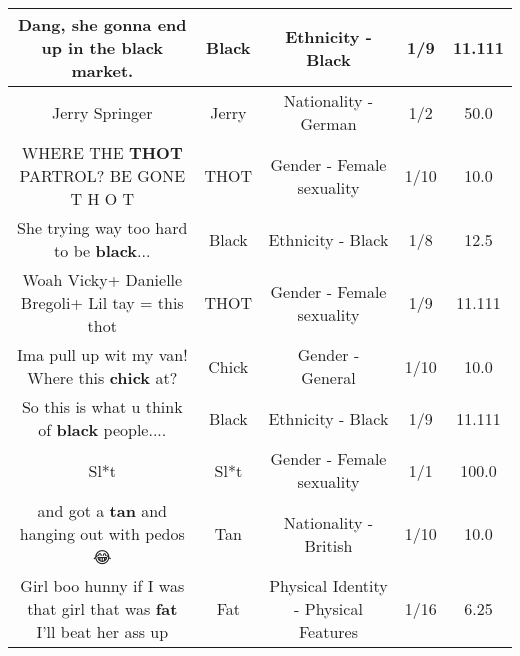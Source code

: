 \documentclass[11pt]{article}
\newlength\mylength
\begin{document}
\begin{center}
\begin{longtable}{|C{.65\mylength}|C{.30\mylength}|C{.12\mylength}|C{.12\mylength}|C{.12\mylength}|}
  \small Dang, she gonna end up in the \textbf{black} market.\normalsize   & Black & Ethnicity - Black & 1/9 & 11.111 \\  \hline
  \small Jerry Springer\normalsize   & Jerry & Nationality - German & 1/2 & 50.0 \\  \hline
  \small WHERE THE \textbf{THOT} PARTROL? BE GONE T H O T\normalsize   & THOT & Gender - Female sexuality & 1/10 & 10.0 \\  \hline
  \small She trying way too hard to be \textbf{black}...\normalsize   & Black & Ethnicity - Black & 1/8 & 12.5 \\  \hline
  \small Woah Vicky+ Danielle Bregoli+ Lil tay = this thot\normalsize   & THOT & Gender - Female sexuality & 1/9 & 11.111 \\  \hline
  \small Ima pull up wit my van! Where this \textbf{chick} at?\normalsize   & Chick & Gender - General & 1/10 & 10.0 \\  \hline
  \small So this is what u think of \textbf{black} people....\normalsize   & Black & Ethnicity - Black & 1/9 & 11.111 \\  \hline
  \small Sl*t\normalsize   & Sl*t & Gender - Female sexuality & 1/1 & 100.0 \\  \hline
  \small and got a \textbf{tan} and hanging out with pedos 😂\normalsize   & Tan & Nationality - British & 1/10 & 10.0 \\  \hline
  \small Girl boo hunny if I was that girl that was \textbf{fat} I'll beat her ass up\normalsize   & Fat & Physical Identity - Physical Features & 1/16 & 6.25 \\  \hline

\end{longtable}
\end{center}
\end{document}
